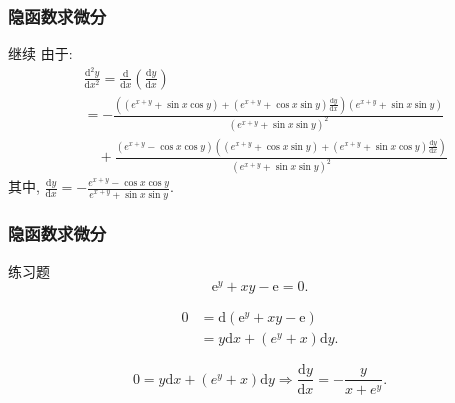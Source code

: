 \documentclass[
10pt,
aspectratio=43,
]{beamer}
\begin{document}
\begin{frame}
	\frametitle{隐函数求微分}
	\everymath{\displaystyle}
	\begin{block}{继续}
		由于:
		$$
			\begin{aligned}
				 & \frac{\mathrm{d}^2y}{\mathrm{d}x^2}=\frac{\mathrm{d}}{\mathrm{d}x}\left(\frac{\mathrm{d}y}{\mathrm{d}x}\right)                                                                                     \\
				 & =-\frac{\left(\left(e^{x+y}+\sin x\cos y\right)+\left(e^{x+y}+\cos x\sin y\right)\frac{\mathrm{d}y}{\mathrm{d}x}\right)\left(e^{x+y}+\sin x\sin y\right)}{\left(e^{x+y}+\sin x\sin y\right)^2}     \\
				 & \quad+\frac{\left(e^{x+y}-\cos x\cos y\right)\left(\left(e^{x+y}+\cos x\sin y\right)+\left(e^{x+y}+\sin x\cos y\right)\frac{\mathrm{d}y}{\mathrm{d}x}\right)}{\left(e^{x+y}+\sin x\sin y\right)^2}
			\end{aligned}
		$$
		其中, $\frac{\mathrm{d}y}{\mathrm{d}x}=-\frac{e^{x+y}-\cos x\cos y}{e^{x+y}+\sin x\sin y}$.
	\end{block}
\end{frame}

\begin{frame}
	\frametitle{隐函数求微分}
	\everymath{\displaystyle}
	\begin{block}{练习题}
		$$
			\mathrm{e}^y+x y-\mathrm{e}=0.
		$$
	\end{block}

	\begin{exampleblock}{}
		$$
		\begin{aligned}
			0&=\mathrm{d}\left(\mathrm{e}^y+x y-\mathrm{e}\right)\\
			&=y\mathrm{d}x+(e^y+x)\mathrm{d}y.
		\end{aligned}
		$$
	\end{exampleblock}
	\begin{exampleblock}{}
		$$
		0=y\mathrm{d}x+(e^y+x)\mathrm{d}y\Rightarrow\frac{\mathrm{d}y}{\mathrm{d}x}=-\frac{y}{x+e^y}.
		$$
	\end{exampleblock}
\end{frame}
\end{document}
